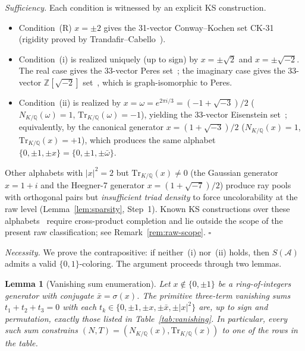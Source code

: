 \documentclass[12pt,a4paper]{article}
\newtheorem{lemma}{Lemma}
\newcommand{\Z}{\mathbb{Z}}
\newcommand{\Q}{\mathbb{Q}}
\newcommand{\Norm}[1]{N_{K/\Q}\!\left(#1\right)}
\newcommand{\Tr}[1]{\mathrm{Tr}_{K/\Q}\!\left(#1\right)}
\begin{document}
\noindent\textit{Sufficiency.}
Each condition is witnessed by an explicit KS construction.
\begin{itemize}
\item Condition~(R) $x = \pm 2$ gives the 31-vector Conway--Kochen set
  CK-31 (rigidity proved by
  Trandafir--Cabello~\cite{TrandafirCabello2025}).
\item Condition~(i) is realized uniquely (up to sign) by
  $x = \pm\sqrt{2}$ and $x = \pm\sqrt{-2}$.  The real case gives the
  33-vector Peres set~\cite{Peres1991}; the imaginary case gives the
  33-vector $\Z[\sqrt{-2}]$ set~\cite{Kernaghan2026islands}, which is
  graph-isomorphic to Peres.
\item Condition~(ii) is realized by $x = \omega = e^{2\pi i/3} =
  (-1{+}\sqrt{-3})/2$ ($\Norm{\omega} = 1$, $\Tr{\omega} = -1$),
  yielding the 33-vector Eisenstein set~\cite{Cabello2025simplest};
  equivalently, by the canonical generator
  $x = (1{+}\sqrt{-3})/2$ ($\Norm{x} = 1$, $\Tr{x} = +1$), which
  produces the same alphabet $\{0, \pm 1, \pm x\} = \{0, \pm 1, \pm
  \bar\omega\}$.
\end{itemize}
Other alphabets with $|x|^2 = 2$ but $\Tr{x} \neq 0$ (the Gaussian
generator $x = 1+i$ and the Heegner-7 generator
$x = (1{+}\sqrt{-7})/2$) produce ray pools with orthogonal pairs but
\emph{insufficient triad density} to force uncolorability at the raw
level (Lemma~\ref{lem:sparsity}, Step~1).  Known
KS constructions over these
alphabets~\cite{Kernaghan2026islands} require cross-product completion
and lie outside the scope of the present raw classification; see
Remark~\ref{rem:raw-scope}.  \hfill$\square$

\medskip

\noindent\textit{Necessity.}
We prove the contrapositive: if neither~(i) nor~(ii) holds, then
$S(\mathcal{A})$ admits a valid $\{0,1\}$-coloring.  The argument
proceeds through two lemmas.

\begin{lemma}[Vanishing sum enumeration]\label{lem:vanishing}
Let $x \notin \{0,\pm 1\}$ be a ring-of-integers generator with
conjugate $\bar{x} = \sigma(x)$.  The primitive three-term vanishing
sums $t_1 + t_2 + t_3 = 0$ with each $t_k \in
\{0,\pm 1,\pm x,\pm \bar{x},\pm |x|^2\}$ are, up to sign and
permutation, exactly those listed in Table~\ref{tab:vanishing}.  In
particular, every such sum constrains $(N,T) = (\Norm{x},\Tr{x})$ to
one of the rows in the table.
\end{lemma}
\end{document}

